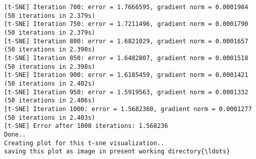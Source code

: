 \documentclass[11pt]{article}
\begin{document}
\begin{Verbatim}[commandchars=\\\{\}]
[t-SNE] Iteration 700: error = 1.7666595, gradient norm = 0.0001984 (50 iterations in 2.379s)
[t-SNE] Iteration 750: error = 1.7211496, gradient norm = 0.0001790 (50 iterations in 2.379s)
[t-SNE] Iteration 800: error = 1.6821029, gradient norm = 0.0001657 (50 iterations in 2.390s)
[t-SNE] Iteration 850: error = 1.6482807, gradient norm = 0.0001518 (50 iterations in 2.398s)
[t-SNE] Iteration 900: error = 1.6185459, gradient norm = 0.0001421 (50 iterations in 2.402s)
[t-SNE] Iteration 950: error = 1.5919563, gradient norm = 0.0001332 (50 iterations in 2.406s)
[t-SNE] Iteration 1000: error = 1.5682360, gradient norm = 0.0001277 (50 iterations in 2.403s)
[t-SNE] Error after 1000 iterations: 1.568236
Done..
Creating plot for this t-sne visualization..
saving this plot as image in present working directory{\ldots}

    \end{Verbatim}

    \begin{center}
    \end{center}
    { \hspace*{\fill} \\}
    
\end{document}
